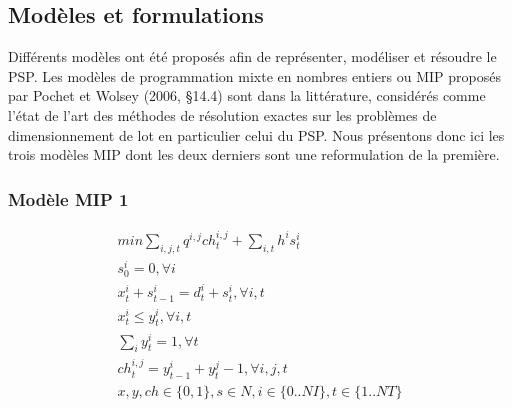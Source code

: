 \documentclass[12pt,a4paper]{article}
\begin{document}
		\subsection{Modèles et formulations}
		Différents modèles ont été proposés afin de représenter, modéliser et résoudre le PSP. Les modèles de programmation mixte en nombres entiers ou MIP proposés par Pochet et Wolsey (2006, §14.4) sont dans la littérature, considérés comme l'état de l'art des méthodes de résolution exactes sur les problèmes de dimensionnement de lot en particulier celui du PSP. Nous présentons donc ici les trois modèles MIP dont les deux derniers sont une reformulation de la première.
		\subsubsection{Modèle MIP 1}
		
		\begin{eqnarray}
			min \sum_{i,j,t} q^{i,j}ch_{t}^{i,j} + \sum_{i,t} h^{i} s_{t}^{i} \\
			s_{0}^{i} = 0, \forall i \\
			x_{t}^{i} + s_{t-1}^{i} = d_{t}^{i} + s_{t}^{i}, \forall i,t \\
			x_{t}^{i} \leq y_{t}^{i}, \forall i,t \\
			\sum_{i} y_{t}^{i} = 1 , \forall t \\
			ch_{t}^{i,j} = y_{t-1}^{i} + y_{t}^{j} - 1, \forall i,j,t \\
			x,y,ch \in \{0,1\}, s \in N, i \in \{0..NI\}, t \in \{1..NT\}
		\end{eqnarray}
		
\end{document}
